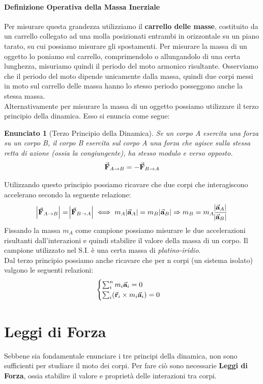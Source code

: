 \documentclass{report}
\newtheorem{enunc}[defn]{Enunciato}
\newcommand{\then}{\ensuremath{\Rightarrow}}
\renewcommand{\a}{\va{a}}
\renewcommand{\r}{\va{r}}
\newcommand{\F}{\va{F}}
\begin{document}
\paragraph{Definizione Operativa della Massa Inerziale}
Per misurare questa grandezza utilizziamo il \textbf{carrello delle masse}, costituito da un carrello collegato ad una molla posizionati entrambi in orizzontale su un piano tarato, su cui possiamo misurare gli spostamenti. Per misurare la massa di un oggetto lo poniamo sul carrello, comprimendolo o allungandolo di una certa lunghezza, misuriamo quindi il periodo del moto armonico risultante. Osserviamo che il periodo del moto dipende unicamente dalla massa, quindi due corpi messi in moto sul carrello delle massa hanno lo stesso periodo posseggono anche la stessa massa. 
\\
Alternativamente per misurare la massa di un oggetto possiamo utilizzare il terzo principio della dinamica. Esso si enuncia come segue:
\begin{enunc}[Terzo Principio della Dinamica]
Se un corpo A esercita una forza su un corpo B, il corpo B esercita sul corpo A una forza che agisce sulla stessa retta di azione (ossia la congiungente), ha stesso modulo e verso opposto.
\[\F_{A\to B}=-\F_{B\to A}\]
\end{enunc}
Utilizzando questo principio possiamo ricavare che due corpi che interagiscono accelerano secondo la seguente relazione:
\[\abs{\F_{A\to B}}=\abs{\F_{B\to A}}\iff m_A\abs{\a_A}=m_B\abs{\a_B}\then m_B=m_A\frac{\abs{\a_A}}{\abs{\a_B}}\]
Fissando la massa $m_A$ come campione possiamo misurare le due accelerazioni risultanti dall'interazioni e quindi stabilire il valore della massa di un corpo. Il campione utilizzato nel S.I. è una certa massa di \textit{platino-iridio}.\\
Dal terzo principio possiamo anche ricavare che per n corpi (un sistema isolato) valgono le seguenti relazioni:
\[\begin{cases}
    \sum_i^nm_i\a_i=0\\
    \sum_i(\r_i\times m_i\a_i)=0
\end{cases}\]


\section{Leggi di Forza}
Sebbene sia fondamentale enunciare i tre principi della dinamica, non sono sufficienti per studiare il moto dei corpi. Per fare ciò sono necessarie \textbf{Leggi di Forza}, ossia stabilire il valore e proprietà delle interazioni tra corpi.
\end{document}
